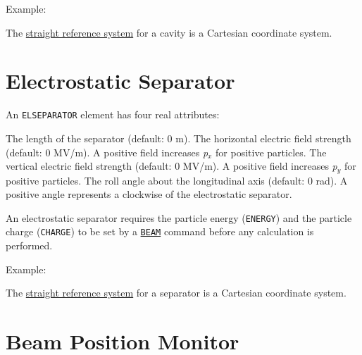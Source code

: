 {Example: 

The \hyperref[subsec:local_straight]{straight reference system} for a
cavity is a Cartesian coordinate system.  
 


\section{Electrostatic Separator}
\label{sec:separator}\label{sec:elseparator}


An {\tt ELSEPARATOR} element has four real attributes: 
\begin{madlist}
    The length of the separator (default: 0 m). 
    The horizontal electric field strength (default: 0 MV/m). 
     A positive field increases \textit{p$_x$} for positive particles.  
    The vertical electric field strength (default: 0 MV/m). 
     A positive field increases \textit{p$_y$} for positive particles.  
    The roll angle about the longitudinal axis (default: 0
     rad). A positive angle represents a clockwise of the electrostatic
     separator.  
\end{madlist}

An electrostatic separator requires the particle energy
({\tt ENERGY}) and the particle charge
({\tt CHARGE}) to be set by a \hyperref[sec"beam]{\tt BEAM}
command before any calculation is performed.  

Example: 

The \hyperref[subsec:local_straight]{straight reference system} for a
separator is a Cartesian coordinate system.   


\section{Beam Position Monitor}
\label{sec:monitor}

}
